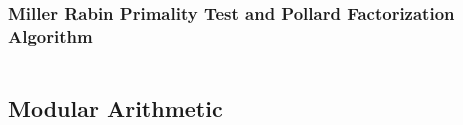 \newpage

\subsubsection{Miller Rabin Primality Test and Pollard Factorization Algorithm}

\hrulefill \vspace{-\baselineskip}
\begin{multicols}{2}
\inputminted[autogobble,fontsize=\footnotesize]{C++}{Maths/pollard.cpp}
\end{multicols}
\vspace{-\baselineskip}
\noindent \hrulefill

\newpage
\subsection{Modular Arithmetic}

